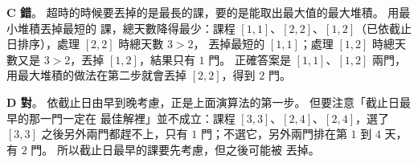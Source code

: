 \begin{pastsoln}
\textbf{C 錯}。 超時的時候要丟掉的是最長的課，要的是能取出最大值的最大堆積。 用最小堆積丟掉最短的
課，總天數降得最少：課程 $[1, 1]$、$[2, 2]$、$[1, 2]$（已依截止日排序），處理 $[2, 2]$ 時總天數 $3 > 2$，
丟掉最短的 $[1, 1]$；處理 $[1, 2]$ 時總天數又是 $3 > 2$，丟掉 $[1, 2]$，結果只有 $1$ 門。 正確答案是
$[1, 1]$、$[1, 2]$ 兩門，用最大堆積的做法在第二步就會丟掉 $[2, 2]$，得到 $2$ 門。

\textbf{D 對}。 依截止日由早到晚考慮，正是上面演算法的第一步。 但要注意「截止日最早的那一門一定在
最佳解裡」並不成立：課程 $[3, 3]$、$[2, 4]$、$[2, 4]$，選了 $[3, 3]$ 之後另外兩門都趕不上，只有
$1$ 門；不選它，另外兩門排在第 $1$ 到 $4$ 天，有 $2$ 門。 所以截止日最早的課要先考慮，但之後可能被
丟掉。
\end{pastsoln}
